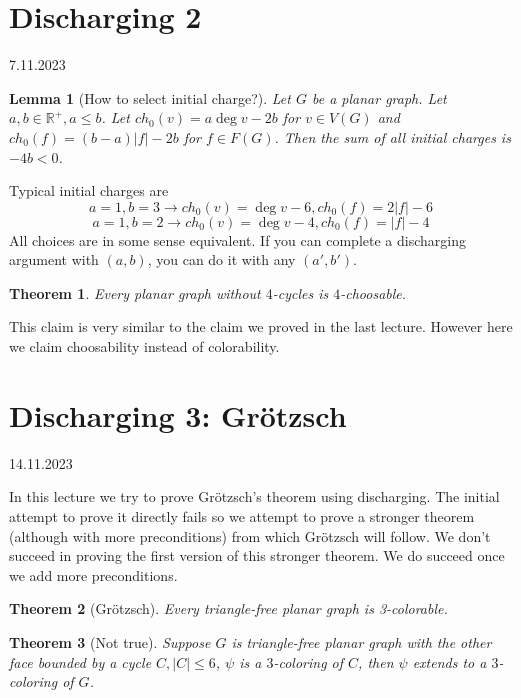 \documentclass{article}
\newtheorem*{theorem}{Theorem}
\newtheorem*{lemma}{Lemma}
\begin{document}
\newpage
\section{Discharging 2} %
7.11.2023

\begin{lemma}[How to select initial charge?]
	Let $G$ be a planar graph. Let $a, b \in \mathbb{R}^+, a \le b$. Let
	$ch_0(v) = a \deg v  - 2b$ for $v \in V(G)$ and $ch_0(f) = (b - a)|f| -
	2b$ for $f \in F(G)$. Then the sum of all initial charges is $-4b < 0$.
\end{lemma}

\noindent
Typical initial charges are
$$a = 1, b = 3 \rightarrow ch_0(v) = \deg v  - 6, ch_0(f) = 2|f|-6$$
$$a = 1, b = 2 \rightarrow ch_0(v) = \deg v - 4, ch_0(f) = |f| - 4$$
All choices are in some sense equivalent. If you can complete a discharging
argument with $(a, b)$, you can do it with any $(a', b')$.

\begin{theorem}
	Every planar graph without $4$-cycles is $4$-choosable.
\end{theorem}

\noindent
This claim is very similar to the claim we proved in the last
lecture. However here we claim choosability instead of colorability.


\newpage
\section{Discharging 3: Grötzsch} %
14.11.2023

\noindent
In this lecture we try to prove Grötzsch's theorem using discharging. The
initial attempt to prove it directly fails so we attempt to prove a stronger
theorem (although with more preconditions) from which Grötzsch will follow.
We don't succeed in proving the first version of this stronger theorem. We do
succeed once we add more preconditions.

\begin{theorem}[Grötzsch]
	Every triangle-free planar graph is 3-colorable.
\end{theorem}

\begin{theorem}[Not true]
	Suppose $G$ is triangle-free planar graph with the other face bounded
	by a cycle $C, |C| \le 6$, $\psi$ is a $3$-coloring of $C$, then $\psi$
	extends to a $3$-coloring of $G$.
\end{theorem}
\end{document}
